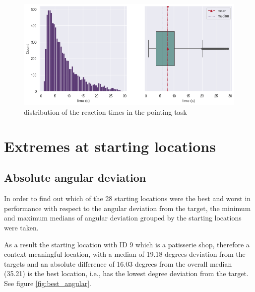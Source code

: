 \begin{figure}[!htb]
	\centering
	\includegraphics[width=150mm]{figures/RT_hist_box_23.png}
	\caption[Distribution of reaction times]{distribution of the  reaction times in the pointing task}
	\label{fig:rt_dists}
\end{figure}

\section{Extremes at starting locations}

\subsection{Absolute angular deviation}

In order to find out which of the 28 starting locations were the best and worst in performance with respect to the angular deviation from the target, the minimum and maximum medians of angular deviation grouped by the starting locations were taken.

As a result the starting location with ID 9 which is a patisserie shop, therefore a context meaningful location, with a median of 19.18 degrees deviation from the targets and an absolute difference of 16.03 degrees from the overall median (35.21) is the best location, i.e., has the lowest degree deviation from the target. See figure \ref{fig:best_angular}.


